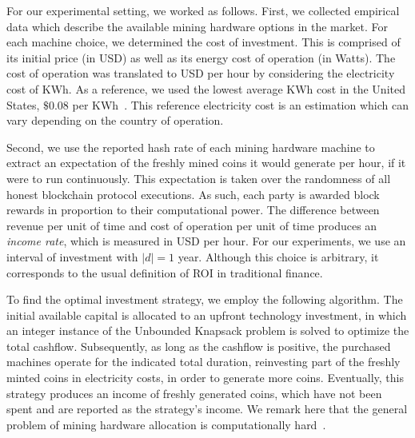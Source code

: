 For our experimental setting, we worked as follows. First, we collected
empirical data which describe the available mining hardware options in the
market. For each machine choice, we determined the cost of investment. This is
comprised of its initial price (in USD) as well as its energy cost of operation
(in Watts). The cost of operation was translated to USD per hour by considering
the electricity cost of KWh. As a reference, we used the lowest average KWh
cost in the United States, \ie $\$0.08$ per KWh~\cite{energy-cost}. This reference electricity cost is an estimation which
can vary depending on the country of operation.

Second, we use the reported hash rate of each mining hardware machine to
extract an expectation of the freshly mined coins it would generate per hour,
if it were to run continuously. This expectation is taken over the randomness
of all honest blockchain protocol executions. As such, each party is awarded
block rewards in proportion to their computational power. The difference
between revenue per unit of time and cost of operation per unit of time
produces an \emph{income rate}, which is measured in USD per hour.
For our experiments, we use an interval of investment with $|d| = 1$ year. Although
this choice is arbitrary, it corresponds to the usual definition of ROI in
traditional finance.

To find the optimal investment strategy, we employ the following algorithm. The
initial available capital is allocated to an upfront technology
investment, in which an integer instance of the Unbounded Knapsack problem
\cite{mathews1896partition} is solved to optimize the total cashflow.
Subsequently, as long as the cashflow is positive, the purchased machines
operate for the indicated total duration, reinvesting part of the freshly
minted coins in electricity costs, in order to generate more coins. Eventually,
this strategy produces an income of freshly generated coins, which have not
been spent and are reported as the strategy's income. We remark here that the
general problem of mining hardware allocation is computationally
hard~\cite{karp1972reducibility}.

